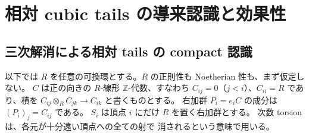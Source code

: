 \section{相対 cubic tails の導来認識と効果性}
\label{sec:relative-cubic-tails}

\subsection{三次解消による相対 tails の compact 認識}

以下では $R$ を任意の可換環とする。$R$ の正則性も
Noetherian 性も、まず仮定しない。
$C$ は正の向きの $R$-線形 $\mathbb Z$-代数、すなわち
$C_{ij}=0$（$j<i$）、$C_{ii}=R$ であり、積を
$C_{ij}\otimes_R C_{jk}\to C_{ik}$ と書くものとする。
右加群 $P_i=e_iC$ の成分は $(P_i)_j=C_{ij}$ である。
$S_i$ は頂点 $i$ にだけ $R$ を置く右加群とする。
次数 torsion は、各元が十分遠い頂点への全ての射で
消されるという意味で用いる。

